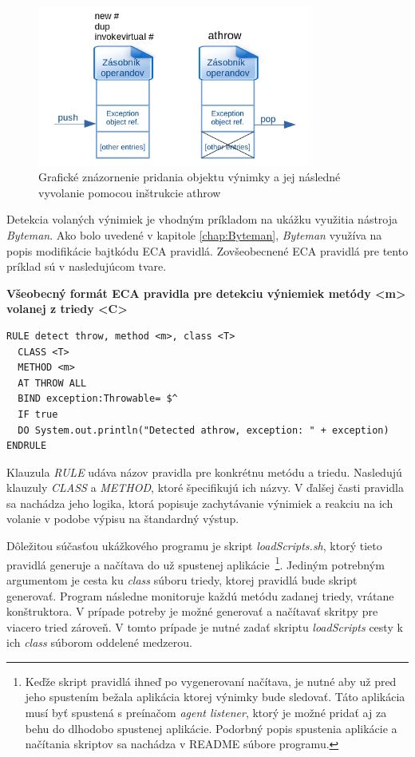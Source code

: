 \documentclass[11pt,final,oneside]{fithesis}
\newenvironment{example}[1]
{
\vspace{3mm}
\noindent\textbf{#1}
\vspace{2mm}
}
{
\vspace{3mm}
}
\begin{document}
\begin{figure}[H]
  \centering
   \includegraphics[width=0.80\textwidth]{throw.png}
  \caption{Grafické znázornenie pridania objektu výnimky a jej následné vyvolanie pomocou inštrukcie athrow}
  \label{fig:throw}
\end{figure}

Detekcia volaných výnimiek je vhodným príkladom na ukážku využitia nástroja \textit{Byteman}. Ako bolo uvedené v kapitole \ref{chap:Byteman}, \textit{Byteman} využíva na popis modifikácie bajtkódu ECA pravidlá. Zovšeobecnené ECA pravidlá pre tento príklad sú v nasledujúcom tvare.

\begin{example}{Všeobecný formát ECA pravidla pre detekciu výniemiek metódy <m> volanej z triedy <C>}
\begin{verbatim}
RULE detect throw, method <m>, class <T>
  CLASS <T>
  METHOD <m>
  AT THROW ALL
  BIND exception:Throwable= $^
  IF true
  DO System.out.println("Detected athrow, exception: " + exception)
ENDRULE
\end{verbatim}
\end{example}

Klauzula \textit{RULE} udáva názov pravidla pre konkrétnu metódu a triedu. Nasledujú klauzuly \textit{CLASS} a \textit{METHOD}, ktoré špecifikujú ich názvy. V ďalšej časti pravidla sa nachádza jeho logika, ktorá popisuje zachytávanie výnimiek a reakciu na ich volanie v podobe výpisu na štandardný výstup.

Dôležitou súčasťou ukážkového programu je skript \textit{loadScripts.sh}, ktorý tieto pravidlá generuje a načítava do už spustenej aplikácie~\footnote{Keďže skript pravidlá ihneď po vygenerovaní načítava, je nutné aby už pred jeho spustením bežala aplikácia ktorej výnimky bude sledovať. Táto aplikácia musí byť spustená s preínačom \textit{agent listener}, ktorý je možné pridať aj za behu do dlhodobo spustenej aplikácie. Podorbný popis spustenia aplikácie a načítania skriptov sa nachádza v README súbore programu.}. Jediným potrebným argumentom je cesta ku \textit{class} súboru triedy, ktorej pravidlá bude skript generovať. Program následne monitoruje každú metódu zadanej triedy, vrátane konštruktora. V prípade potreby je možné generovať a načítavať skritpy pre viacero tried zároveň. V tomto prípade je nutné zadať skriptu \textit{loadScripts} cesty k ich \textit{class} súborom oddelené medzerou.
\end{document}
